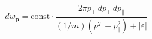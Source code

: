 \par\[
 dw_{\mathbf p}=\mathrm{const}\cdot
 \frac{2\pi p_\perp\,dp_\perp\,dp_\parallel}
 {(1/m)(p_\perp^2+p_\parallel^2)+|\varepsilon|}
\]
